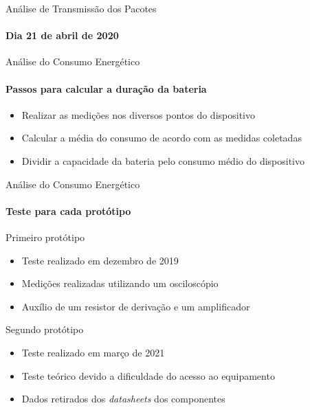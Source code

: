 \begin{frame}{Análise de Transmissão dos Pacotes}
  \framesubtitle{Dia 21 de abril de 2020}
\end{frame}

\begin{frame}{Análise do Consumo Energético}
  \framesubtitle{Passos para calcular a duração da bateria}
  \begin{itemize}
    \item Realizar as medições nos diversos pontos do dispositivo
    \item Calcular a média do consumo de acordo com as medidas coletadas
    \item Dividir a capacidade da bateria pelo consumo médio do dispositivo
  \end{itemize}
\end{frame}

\begin{frame}{Análise do Consumo Energético}
  \framesubtitle{Teste para cada protótipo}
  Primeiro protótipo
  \begin{itemize}
    \item Teste realizado em dezembro de 2019
    \item Medições realizadas utilizando um osciloscópio
    \item Auxílio de um resistor de derivação e um amplificador
  \end{itemize}

  \bigskip Segundo protótipo
  \begin{itemize}
    \item Teste realizado em março de 2021
    \item Teste teórico devido a dificuldade do acesso ao equipamento
    \item Dados retirados dos \textit{datasheets} dos componentes
  \end{itemize}
\end{frame}

